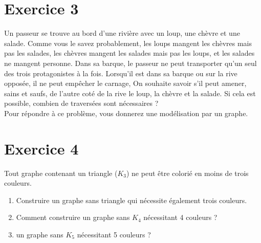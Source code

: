 \documentclass[10pt,a4paper]{article}
\begin{document}
\section*{Exercice 3}
Un passeur se trouve au bord d'une rivière avec un loup, une chèvre et une salade. Comme vous le savez probablement, les loups mangent les chèvres mais pas les salades, les chèvres mangent les salades mais pas les loups, et les salades ne mangent personne. Dans sa barque, le passeur ne peut transporter qu'un seul des trois protagonistes à la fois. Lorsqu'il est dans sa barque ou sur la rive opposée, il ne peut empêcher le carnage, On souhaite savoir s'il peut amener, sains et saufs, de l'autre coté de la rive le loup, la chèvre et la salade.
Si cela est possible, combien de traversées sont nécessaires ?\\
Pour répondre à ce problème, vous donnerez une modélisation par un graphe.

\section*{Exercice 4}

Tout graphe contenant un triangle ($K_3$) ne peut être colorié en moins de trois couleurs.

\begin{enumerate}
    \item Construire un graphe sans triangle qui nécessite également trois couleurs.
    \item Comment construire un graphe sans $K_4$ nécessitant 4 couleurs ?
    \item un graphe sans $K_5$ nécessitant 5 couleurs ?
\end{enumerate}
\end{document}
